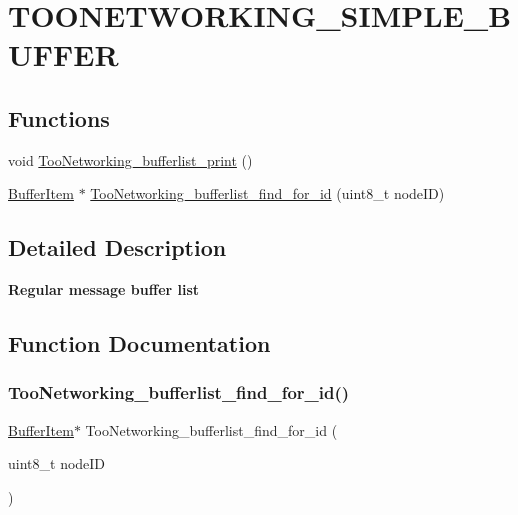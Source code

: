 \hypertarget{group__TOONETWORKING__SIMPLE__BUFFER}{}\section{T\+O\+O\+N\+E\+T\+W\+O\+R\+K\+I\+N\+G\+\_\+\+S\+I\+M\+P\+L\+E\+\_\+\+B\+U\+F\+F\+ER}
\label{group__TOONETWORKING__SIMPLE__BUFFER}
\subsection*{Functions}
\begin{DoxyCompactItemize}
\item 
void \hyperlink{group__TOONETWORKING__SIMPLE__BUFFER_ga2b5485b317146ce7c14bbad26172d796}{Too\+Networking\+\_\+bufferlist\+\_\+print} ()
\item 
\hyperlink{structBufferItem}{Buffer\+Item} $\ast$ \hyperlink{group__TOONETWORKING__SIMPLE__BUFFER_ga0dd5e9de81eea99b99669a607c9b4028}{Too\+Networking\+\_\+bufferlist\+\_\+find\+\_\+for\+\_\+id} (uint8\+\_\+t node\+ID)
\end{DoxyCompactItemize}


\subsection{Detailed Description}
{\bfseries Regular message buffer list} 

\subsection{Function Documentation}
\mbox{\label{group__TOONETWORKING__SIMPLE__BUFFER_ga0dd5e9de81eea99b99669a607c9b4028}} 
\subsubsection{\texorpdfstring{Too\+Networking\+\_\+bufferlist\+\_\+find\+\_\+for\+\_\+id()}{TooNetworking\_bufferlist\_find\_for\_id()}}
{\footnotesize\ttfamily \hyperlink{structBufferItem}{Buffer\+Item}$\ast$ Too\+Networking\+\_\+bufferlist\+\_\+find\+\_\+for\+\_\+id (\begin{DoxyParamCaption}\item[{uint8\+\_\+t}]{node\+ID }\end{DoxyParamCaption})}

